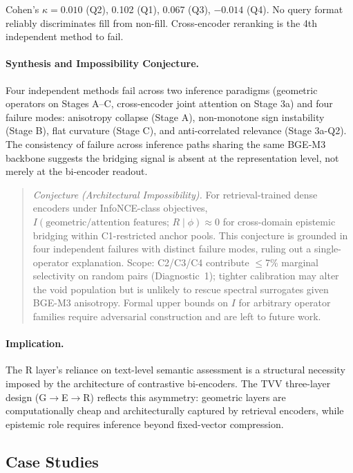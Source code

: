 \documentclass[11pt,twocolumn]{article}
\begin{document}
Cohen's $\kappa = 0.010$ (Q2), 0.102 (Q1), 0.067 (Q3), $-0.014$ (Q4). No query format
reliably discriminates fill from non-fill. Cross-encoder reranking is the 4th
independent method to fail.

\paragraph{Synthesis and Impossibility Conjecture.}
Four independent methods fail across two inference paradigms (geometric operators
on Stages A--C, cross-encoder joint attention on Stage 3a) and four failure modes:
anisotropy collapse (Stage A), non-monotone sign instability (Stage B), flat
curvature (Stage C), and anti-correlated relevance (Stage 3a-Q2).
The consistency of failure across inference paths sharing the same BGE-M3 backbone
suggests the bridging signal is absent at the representation level, not merely at
the bi-encoder readout.

\begin{quote}\small
\emph{Conjecture (Architectural Impossibility).}
For retrieval-trained dense encoders under InfoNCE-class objectives,
$I(\text{geometric/attention features};\,R\mid\phi) \approx 0$
for cross-domain epistemic bridging within C1-restricted anchor pools.
This conjecture is grounded in four independent failures with distinct failure
modes, ruling out a single-operator explanation. Scope: C2/C3/C4 contribute
$\leq$7\% marginal selectivity on random pairs (Diagnostic~1); tighter
calibration may alter the void population but is unlikely to rescue
spectral surrogates given BGE-M3 anisotropy. Formal upper bounds on $I$
for arbitrary operator families require adversarial construction and are
left to future work.
\end{quote}

\paragraph{Implication.}
The R layer's reliance on text-level semantic assessment is a structural
necessity imposed by the architecture of contrastive bi-encoders.
The TVV three-layer design (G$\to$E$\to$R) reflects this asymmetry: geometric
layers are computationally cheap and architecturally captured by retrieval
encoders, while epistemic role requires inference beyond fixed-vector compression.

\subsection{Case Studies}
\end{document}
